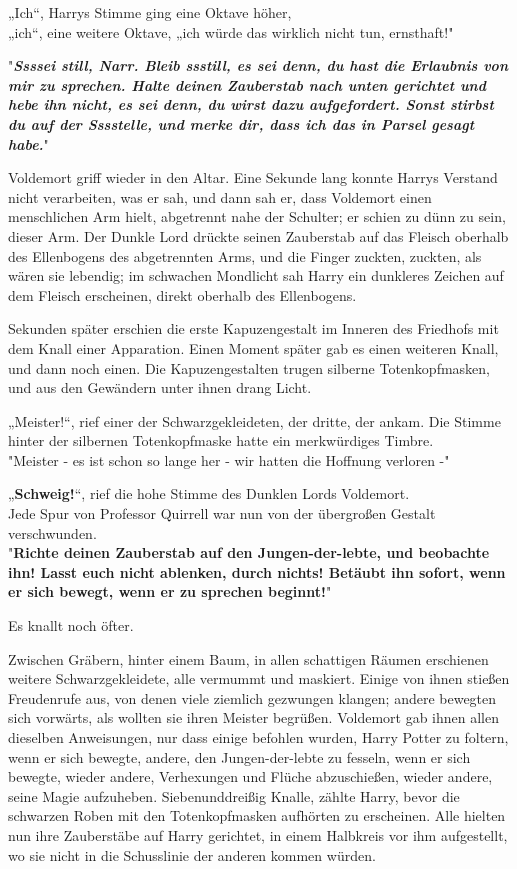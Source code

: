 {„Ich“, Harrys Stimme ging eine Oktave höher,\\ „ich“, eine weitere Oktave, „ich würde das wirklich nicht tun, ernsthaft!"

"\textbf{\emph{Ssssei still, Narr. Bleib ssstill, es sei denn, du hast die Erlaubnis von mir zu sprechen. Halte deinen Zauberstab nach unten gerichtet und hebe ihn nicht, es sei denn, du wirst dazu aufgefordert. Sonst stirbst du auf der Sssstelle, und merke dir, dass ich das in Parsel gesagt habe.}}"

Voldemort griff wieder in den Altar. Eine Sekunde lang konnte Harrys Verstand nicht verarbeiten, was er sah, und dann sah er, dass Voldemort einen menschlichen Arm hielt, abgetrennt nahe der Schulter; er schien zu dünn zu sein, dieser Arm. Der Dunkle Lord drückte seinen Zauberstab auf das Fleisch oberhalb des Ellenbogens des abgetrennten Arms, und die Finger zuckten, zuckten, als wären sie lebendig; im schwachen Mondlicht sah Harry ein dunkleres Zeichen auf dem Fleisch erscheinen, direkt oberhalb des Ellenbogens.

Sekunden später erschien die erste Kapuzengestalt im Inneren des Friedhofs mit dem Knall einer Apparation. Einen Moment später gab es einen weiteren Knall, und dann noch einen. Die Kapuzengestalten trugen silberne Totenkopfmasken, und aus den Gewändern unter ihnen drang Licht.

„Meister!“, rief einer der Schwarzgekleideten, der dritte, der ankam. Die Stimme hinter der silbernen Totenkopfmaske hatte ein merkwürdiges Timbre.\\ "Meister - es ist schon so lange her - wir hatten die Hoffnung verloren -"

„\textbf{Schweig!}“, rief die hohe Stimme des Dunklen Lords Voldemort.\\ Jede Spur von Professor Quirrell war nun von der übergroßen Gestalt verschwunden.\\ "\textbf{Richte deinen Zauberstab auf den Jungen-der-lebte, und beobachte ihn! Lasst euch nicht ablenken, durch nichts! Betäubt ihn sofort, wenn er sich bewegt, wenn er zu sprechen beginnt!}"

Es knallt noch öfter.

Zwischen Gräbern, hinter einem Baum, in allen schattigen Räumen erschienen weitere Schwarzgekleidete, alle vermummt und maskiert. Einige von ihnen stießen Freudenrufe aus, von denen viele ziemlich gezwungen klangen; andere bewegten sich vorwärts, als wollten sie ihren Meister begrüßen. Voldemort gab ihnen allen dieselben Anweisungen, nur dass einige befohlen wurden, Harry Potter zu foltern, wenn er sich bewegte, andere, den Jungen-der-lebte zu fesseln, wenn er sich bewegte, wieder andere, Verhexungen und Flüche abzuschießen, wieder andere, seine Magie aufzuheben. Siebenunddreißig Knalle, zählte Harry, bevor die schwarzen Roben mit den Totenkopfmasken aufhörten zu erscheinen. Alle hielten nun ihre Zauberstäbe auf Harry gerichtet, in einem Halbkreis vor ihm aufgestellt, wo sie nicht in die Schusslinie der anderen kommen würden.

}
